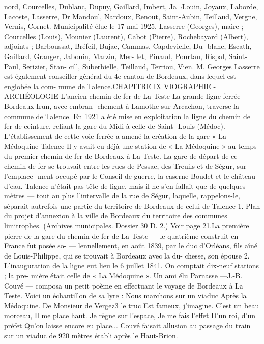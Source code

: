 \documentclass[a4paper,11pt]{book}
\begin{document}
nord, Courcelles, Dublanc, Dupuy, Gaillard, Imbert, Ja¬Louin, Joyaux, Laborde, Lacoste, Lasserre, Dr Mandoul,
Nardoux, Renout, Saint-Aubin, Teillaud, Vergne, Vernis,
Cornet.
Municipalité élue le 17 mai 1925.
Lasserre (Georges), maire ; Courcelles (Louis), Mounier
(Laurent), Cabot (Pierre), Rochebayard (Albert), adjoints ;
Barboussat, Bréfeil, Bujac, Cammas, Capdevielle, Du-
blanc, Escath, Gaillard, Granger, Jabouin, Marzin, Mer-
let, Pinaud, Pourtau, Rispal, Saint-Paul, Serizier, Stan-
cill, Suberbielle, Teillaud, Terriou, Vien.
M. Georges Lasserre est également conseiller général du
4e canton de Bordeaux, dans lequel est englobée la com-
mune de Talence.CHAPITRE IX
VIOGRAPHIE - ARCHÉOLOGIE
L'ancien chemin de fer de La Teste
La grande ligne ferrée Bordeaux-Irun, avec embran-
chement à Lamothe sur Arcachon, traverse la commune
de Talence.
En 1921 a été mise en exploitation la ligne du chemin
de fer de ceinture, reliant la gare du Midi à celle de Saint-
Louis (Médoc). L'établissement de cette voie ferrée a amené
la création de la gare « La Médoquine-Talence
Il y avait eu déjà une station de « La Médoquine » au
temps du premier chemin de fer de Bordeaux à La Teste.
La gare de départ de ce chemin de fer se trouvait entre
les rues de Pessac, des Treuils et de Ségur, sur l'emplace-
ment occupé par le Conseil de guerre, la caserne Boudet
et le château d'eau.
Talence n'était pas tête de ligne, mais il ne s'en fallait
que de quelques mètres — tout au plus l'intervalle de la
rue de Ségur, laquelle, rappelons-le, séparait autrefois
une partie du territoire de Bordeaux de celui de Talence
1. Plan du projet d'annexion à la ville de Bordeaux du territoire des
communes limitrophes. (Archives municipales. Dossier 30 D. 2.) Voir
page 21.La première pierre de la gare du chemin de fer de La
Teste — le quatrième construit en France
fut
posée so-
—
lennellement, en août 1839, par le duc d'Orléans, fils aîné de
Louis-Philippe, qui se trouvait à Bordeaux avec la du-
chesse, son épouse 2. L'inauguration de la ligne eut lieu
le 6 juillet 1841. On comptait dix-neuf stations ; la pre-
mière était celle de « La Médoquine ».
Un ami élu Parnasse —J.-B. Couvé — composa un petit
poème en effectuant le voyage de Bordeaux à La Teste.
Voici un échantillon de sa lyre :
Nous marchons sur un viaduc
Après la Médoquine.
De Monsieur de Vergez3 le truc
Est fameux, j'imagine.
C'est un beau morceau,
Il me place haut.
Je règne sur l'espace,
Je me fais l'effet
D'un roi, d'un préfet
Qu'on laisse encore eu place...
Couvé faisait allusion au passage du train sur un viaduc
de 920 mètres établi après le Haut-Brion.
\end{document}
